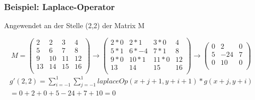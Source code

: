 \documentclass[aspectratio=169]{beamer}
\begin{document}
\begin{frame}
    \frametitle{Beispiel: Laplace-Operator}
    \begin{alertblock}
        {Angewendet an der Stelle (2,2) der Matrix M}
    \begin{center}
        \begin{equation} M =
            \begin{pmatrix}
                 2 &  2 &  3 &  4\\
                 5 &  6 &  7 &  8\\
                 9 & 10 & 11 & 12\\
                13 & 14 & 15 & 16\\
            \end{pmatrix}
            \rightarrow 
            \begin{pmatrix}
                 2*0 &  2*1  &  3*0 &  4\\
                 5*1 &  6*-4 &  7*1 &  8\\
                 9*0 & 10*1  & 11*0 & 12\\
                13 & 14 & 15 & 16\\
            \end{pmatrix}
            \rightarrow
            \begin{pmatrix}
                0 &   2 &  0\\
                5 & -24 &  7\\
                0 &  10 &  0\\
            \end{pmatrix}
        \end{equation}
        \begin{equation}
        \begin{aligned}
            g'(2,2) =\sum_{i=-1}^{1}\sum_{j=-1}^{1}laplaceOp(x+j+1,y+i+1)*g(x+j,y+i) \\
            = 0+2+0+5-24+7+10 = 0
        \end{aligned}
        \end{equation}
    \end{center}
    \end{alertblock}
\end{frame}
\end{document}
